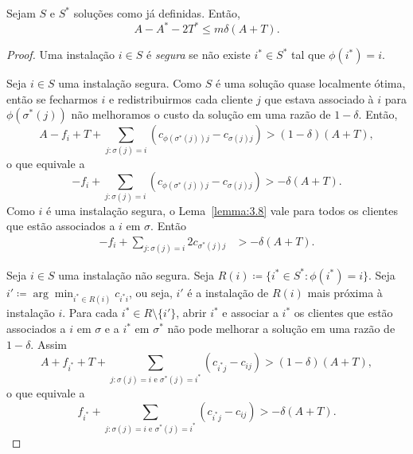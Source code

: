 \begin{lemma}
    \label{lema:3.14}
    Sejam $S$ e $S^*$ soluções como já definidas. Então,
    \[A - A^* - 2T^* \leq m \delta(A+T).\]
\end{lemma}
\begin{proof}
    Uma instalação $i \in S$ é \emph{segura} se não existe $i^* \in S^*$ tal que $\phi(i^*)=i$.

    Seja $i \in S$ uma instalação segura. Como $S$ é uma solução quase localmente ótima, então se fecharmos $i$ e redistribuirmos cada cliente $j$ que estava associado à $i$ para $\phi(\sigma^*(j))$  não melhoramos o custo da solução em uma razão de $1-\delta$. Então,
    \[
        A - f_i + T + \sum_{j:\sigma(j) = i} (c_{\phi(\sigma^*(j))j} - c_{\sigma(j)j}) > (1-\delta)(A+T),\]
        o que equivale a 
        \[
        - f_i + \sum_{j:\sigma(j) = i} (c_{\phi(\sigma^*(j))j} - c_{\sigma(j)j}) > -\delta(A+T).
        \]
    Como $i$ é uma instalação segura, o Lema~\ref{lemma:3.8} vale para todos os clientes que estão associados a $i$ em $\sigma$. Então
    \begin{align} 
        \label{segura}
        - f_i + \sum_{j:\sigma(j) = i} 2c_{\sigma^*(j)j} &> -\delta(A+T).
    \end{align}

    Seja $i\in S$ uma instalação não segura. Seja $R(i)\coloneqq \{i^* \in S^* : \phi(i^*) = i\}$. Seja $i' \coloneqq \arg\min_{i^* \in R(i)} c_{i^*i}$, ou seja, $i'$ é a instalação de $R(i)$ mais próxima à instalação $i$.
    Para cada $i^* \in R\setminus\{i'\}$, abrir $i^*$ e associar a $i^*$ os clientes que estão associados a $i$ em $\sigma $ e a $i^*$ em $\sigma^*$ não pode melhorar a solução em uma razão de $1-\delta$. Assim
    \[
        A + f_{i^*} + T + \sum_{j: \sigma(j) = i \text{ e } \sigma^*(j) = i^*}(c_{i^*j} - c_{ij}) > (1-\delta)(A+T),\]
    o que equivale a 
        \begin{equation}
        \label{não segura}
        f_{i^*} + \sum_{j: \sigma(j) = i \text{ e } \sigma^*(j) = i^*}(c_{i^*j} - c_{ij}) > -\delta(A+T).        
    \end{equation}    


\end{proof}
